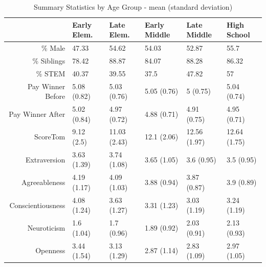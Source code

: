 \begin{table}[ht]
\centering
\begin{tabular}{rlllll}
  \hline
 & Early Elem. & Late Elem. & Early Middle & Late Middle & High School \\ 
  \hline
\% Male & 47.33 & 54.62 & 54.03 & 52.87 & 55.7 \\ 
  \% Siblings & 78.42 & 88.87 & 84.07 & 88.28 & 86.32 \\ 
  \% STEM & 40.37 & 39.55 & 37.5 & 47.82 & 57 \\ 
  Pay Winner Before & 5.08 (0.82) & 5.03 (0.76) & 5.05 (0.76) & 5 (0.75) & 5.04 (0.74) \\ 
  Pay Winner After & 5.02 (0.84) & 4.97 (0.72) & 4.88 (0.71) & 4.91 (0.75) & 4.95 (0.71) \\ 
  ScoreTom & 9.12 (2.5) & 11.03 (2.43) & 12.1 (2.06) & 12.56 (1.97) & 12.64 (1.75) \\ 
  Extraversion & 3.63 (1.39) & 3.74 (1.08) & 3.65 (1.05) & 3.6 (0.95) & 3.5 (0.95) \\ 
  Agreeableness & 4.19 (1.17) & 4.09 (1.03) & 3.88 (0.94) & 3.87 (0.87) & 3.9 (0.89) \\ 
  Conscientiousness & 4.08 (1.24) & 3.63 (1.27) & 3.31 (1.23) & 3.03 (1.19) & 3.24 (1.19) \\ 
  Neuroticism & 1.6 (1.04) & 1.7 (0.96) & 1.89 (0.92) & 2.03 (0.91) & 2.13 (0.93) \\ 
  Openness & 3.44 (1.54) & 3.13 (1.29) & 2.87 (1.14) & 2.83 (1.09) & 2.97 (1.05) \\ 
   \hline
\end{tabular}
\caption{Summary Statistics by Age Group - mean (standard deviation)} 
\label{tab:summary}
\end{table}

